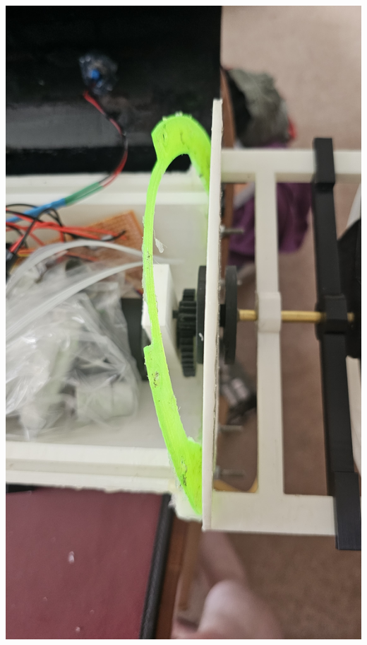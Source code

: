 \documentclass[11pt,a4paper,titlepage]{report}
\begin{document}
	\begin{center}
		\label{picture:images_parts_7}
		\includegraphics[width=\linewidth]{assets/MainProp3.jpg}
	\end{center}
	
\end{document}
